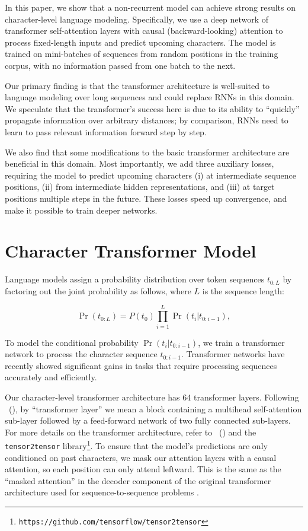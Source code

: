 In this paper, we show that a non-recurrent model can achieve strong results on character-level language modeling. Specifically, we use a deep network of transformer self-attention layers \cite{NIPS2017_7181} with causal (backward-looking) attention to process fixed-length inputs and predict upcoming characters. The model is trained on mini-batches of sequences from random positions in the training corpus, with no information passed from one batch to the next.

Our primary finding is that the transformer architecture is well-suited to language modeling over long sequences and could replace RNNs in this domain. We speculate that the transformer's success here is due to its ability to ``quickly'' propagate information over arbitrary distances; by comparison, RNNs need to learn to pass relevant information forward step by step.

We also find that some modifications to the basic transformer architecture are beneficial in this domain. Most importantly, we add three auxiliary losses, requiring the model to predict upcoming characters (i) at intermediate sequence positions, (ii) from intermediate hidden representations, and (iii) at target positions multiple steps in the future. These losses speed up convergence, and make it possible to train deeper networks.

\section{Character Transformer Model}

Language models assign a probability distribution over token sequences $t_{0:L}$ by factoring out the joint probability as follows, where $L$ is the sequence length:

\begin{equation}
    \Pr(t_{0:L}) = P(t_0) \prod_{i=1}^{L} \Pr(t_i|t_{0:i-1}),
\end{equation}

To model the conditional probability $\Pr(t_i|t_{0:i-1})$, we train a transformer network to process the character sequence $t_{0:i-1}$. Transformer networks have recently showed significant gains in tasks that require processing sequences accurately and efficiently.

Our character-level transformer architecture has 64 transformer layers. Following \citeauthor{NIPS2017_7181}~(\citeyear{NIPS2017_7181}), by ``transformer layer'' we mean a block containing a multihead self-attention sub-layer followed by a feed-forward network of two fully connected sub-layers. For more details on the transformer architecture, refer to \citeauthor{NIPS2017_7181}~(\citeyear{NIPS2017_7181}) and the \texttt{tensor2tensor} library\footnote{\texttt{https://github.com/tensorflow/tensor2tensor}}.
To ensure that the model's predictions are only conditioned on past characters, we mask our attention layers with a causal attention, so each position can only attend leftward. This is the same as the ``masked attention'' in the decoder component of the original transformer architecture used for sequence-to-sequence problems \cite{NIPS2017_7181}.

